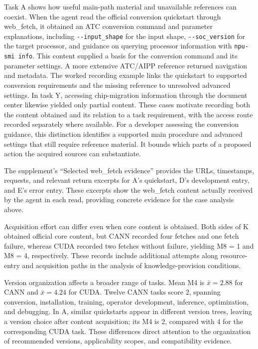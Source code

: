 \documentclass[manuscript,review,anonymous]{acmart}
\begin{document}
Task A shows how useful main-path material and unavailable references can coexist. When the agent read the official conversion quickstart through web\_fetch, it obtained an ATC conversion command and parameter explanations, including \texttt{-\/-input\_shape} for the input shape, \texttt{-\/-soc\_version} for the target processor, and guidance on querying processor information with \texttt{npu-smi\ info}. This content supplied a basis for the conversion command and its parameter settings. A more extensive ATC/AIPP reference returned navigation and metadata. The worked recording example links the quickstart to supported conversion requirements and the missing reference to unresolved advanced settings. In task Y, accessing chip-migration information through the document center likewise yielded only partial content. These cases motivate recording both the content obtained and its relation to a task requirement, with the access route recorded separately where available. For a developer assessing the conversion guidance, this distinction identifies a supported main procedure and advanced settings that still require reference material. It bounds which parts of a proposed action the acquired sources can substantiate.

The supplement's ``Selected web\_fetch evidence'' provides the URLs, timestamps, requests, and relevant return excerpts for A's quickstart, D's development entry, and E's error entry. These excerpts show the web\_fetch content actually received by the agent in each read, providing concrete evidence for the case analysis above.

Acquisition effort can differ even when core content is obtained. Both sides of K obtained official core content, but CANN recorded four fetches and one fetch failure, whereas CUDA recorded two fetches without failure, yielding M8 = 1 and M8 = 4, respectively. These records include additional attempts along resource-entry and acquisition paths in the analysis of knowledge-provision conditions.

Version organization affects a broader range of tasks. Mean M4 is \(\bar{x}=2.88\) for CANN and \(\bar{x}=4.24\) for CUDA. Twelve CANN tasks score 2, spanning conversion, installation, training, operator development, inference, optimization, and debugging. In A, similar quickstarts appear in different version trees, leaving a version choice after content acquisition; its M4 is 2, compared with 4 for the corresponding CUDA task. These differences direct attention to the organization of recommended versions, applicability scopes, and compatibility evidence.
\end{document}
